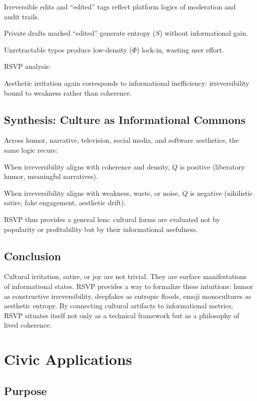 \documentclass{book}
\begin{document}
Irreversible edits and “edited” tags reflect platform logics of moderation and audit trails.

Private drafts marked “edited” generate entropy (\( S \)) without informational gain.

Unretractable typos produce low-density (\( \Phi \)) lock-in, wasting user effort.

RSVP analysis:

Aesthetic irritation again corresponds to informational inefficiency: irreversibility bound to weakness rather than coherence.

\section{Synthesis: Culture as Informational Commons}

Across humor, narrative, television, social media, and software aesthetics, the same logic recurs:

When irreversibility aligns with coherence and density, \( Q \) is positive (liberatory humor, meaningful narratives).

When irreversibility aligns with weakness, waste, or noise, \( Q \) is negative (nihilistic satire, fake engagement, aesthetic drift).

RSVP thus provides a general lens: cultural forms are evaluated not by popularity or profitability but by their informational usefulness.

\section{Conclusion}

Cultural irritation, satire, or joy are not trivial. They are surface manifestations of informational states. RSVP provides a way to formalize these intuitions: humor as constructive irreversibility, deepfakes as entropic floods, emoji monocultures as aesthetic entropy. By connecting cultural artifacts to informational metrics, RSVP situates itself not only as a technical framework but as a philosophy of lived coherence.

\chapter{Civic Applications}

\section{Purpose}
\end{document}
